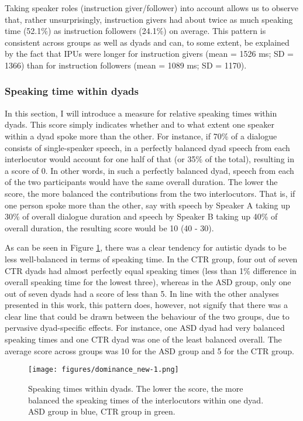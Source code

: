 Taking speaker roles (instruction giver/follower) into account allows us to observe that, rather unsurprisingly, instruction givers had about twice as much speaking time (52.1\%) as instruction followers (24.1\%) on average. This pattern is consistent across groups as well as dyads and can, to some extent, be explained by the fact that IPUs were longer for instruction givers (mean = 1526 ms; SD = 1366) than for instruction followers (mean = 1089 ms; SD = 1170).




\subsubsection{Speaking time within dyads}\label{turntaking_results_signal_dominance}


In this section, I will introduce a measure for relative speaking times within dyads. This score simply indicates whether and to what extent one speaker with\-in a dyad spoke more than the other. For instance, if 70\% of a dialogue consists of single-speaker speech, in a perfectly balanced dyad speech from each interlocutor would account for one half of that (or 35\% of the total), resulting in a score of 0. In other words, in such a perfectly balanced dyad, speech from each of the two participants would have the same overall duration. The lower the score, the more balanced the contributions from the two interlocutors. That is, if one person spoke more than the other, say with speech by Speaker A taking up 30\% of overall dialogue duration and speech by Speaker B taking up 40\% of overall duration, the resulting score would be 10 (40 - 30).

As can be seen in Figure \ref{fig:Dominance}, there was a clear tendency for autistic dyads to be less well-balanced in terms of speaking time. In the CTR group, four out of seven CTR dyads had almost perfectly equal speaking times (less than 1\% difference in overall speaking time for the lowest three), whereas in the ASD group, only one out of seven dyads had a score of less than 5. In line with the other analyses presented in this work, this pattern does, however, not signify that there was a clear line that could be drawn between the behaviour of the two groups, due to pervasive dyad-specific effects. For instance, one ASD dyad had very balanced speaking times and one CTR dyad was one of the least balanced overall. The average score across groups was 10 for the ASD group and 5 for the CTR group.


\begin{figure}

{\centering \texttt{[image: figures/dominance\_new-1.png]} 
	
}

\caption{Speaking times within dyads. The lower the score, the more balanced the speaking times of the interlocutors within one dyad. ASD group in blue, CTR group in green.}\label{fig:Dominance}
\end{figure}

